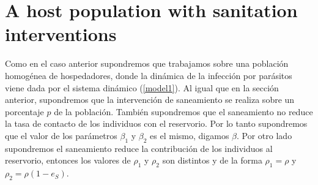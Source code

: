 \documentclass[12pt,a4paper]{article}
\theoremstyle{plain}%
\theoremstyle{definition}
\theoremstyle{remark}
\begin{document}
	
	\section{A host population with sanitation interventions}
	Como en el caso anterior supondremos que trabajamos sobre una población homogénea de hospedadores, 
	donde la dinámica de la infección por parásitos  viene dada por el sistema dinámico (\ref{model1}).
	Al igual que en la sección anterior, supondremos que la intervención de saneamiento se realiza sobre un porcentaje  $p$ de la población. También supondremos que el saneamiento no reduce la tasa de contacto de los individuos con el reservorio. 
	Por lo tanto supondremos que el valor de los parámetros $\beta_1$ y $\beta_2$ es el mismo, digamos $\beta$.
	Por otro lado supondremos el saneamiento reduce la contribución de los individuos al reservorio, entonces los valores de $\rho_1$ y $\rho_2$ son distintos y de la forma $\rho_1=\rho$ y $\rho_2=\rho(1-e_S)$. 	
	
\end{document}
